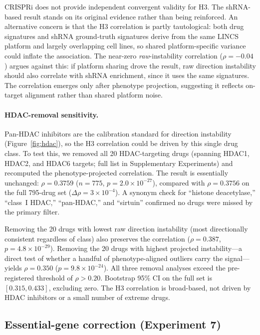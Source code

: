 \documentclass[11pt]{article}
\begin{document}
CRISPRi does not provide independent convergent validity for H3. The
shRNA-based result stands on its original evidence rather than being
reinforced. An alternative concern is that the H3 correlation is
partly tautological: both drug signatures and shRNA ground-truth
signatures derive from the same LINCS platform and largely overlapping
cell lines, so shared platform-specific variance could inflate the
association. The near-zero \emph{raw}-instability correlation
($\rho = -0.04$) argues against this: if platform sharing drove the
result, raw direction instability should also correlate with shRNA enrichment, since
it uses the same signatures. The correlation emerges only after
phenotype projection, suggesting it reflects on-target alignment
rather than shared platform noise.

\paragraph{HDAC-removal sensitivity.}
Pan-HDAC inhibitors are the calibration standard for direction instability
(Figure~\ref{fig:hdac}), so the H3 correlation could be driven by this
single drug class. To test this, we removed all 20 HDAC-targeting drugs
(spanning HDAC1, HDAC2, and HDAC6 targets; full list in Supplementary Experiments)
and recomputed the phenotype-projected correlation. The result is
essentially unchanged: $\rho = 0.3759$ ($n = 775$,
$p = 2.0 \times 10^{-27}$), compared with $\rho = 0.3756$ on the full
795-drug set ($\Delta\rho = 3 \times 10^{-4}$). A synonym check for ``histone
deacetylase,'' ``class~I HDAC,'' ``pan-HDAC,'' and ``sirtuin'' confirmed
no drugs were missed by the primary filter.

Removing the 20 drugs with lowest raw direction instability (most directionally
consistent regardless of class) also preserves the correlation
($\rho = 0.387$, $p = 4.8 \times 10^{-29}$). Removing the 20 drugs with
highest projected instability---a direct test of whether a handful of
phenotype-aligned outliers carry the signal---yields $\rho = 0.350$
($p = 9.8 \times 10^{-24}$). All three removal analyses exceed the
pre-registered threshold of $\rho > 0.20$. Bootstrap 95\% CI on the full
set is $[0.315, 0.433]$, excluding zero. The H3 correlation is broad-based,
not driven by HDAC inhibitors or a small number of extreme drugs.

\subsection{Essential-gene correction (Experiment 7)}
\end{document}
